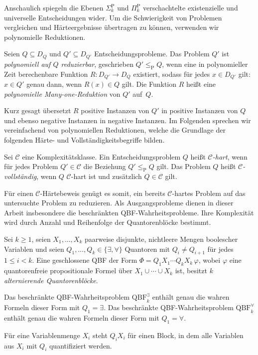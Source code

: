Anschaulich spiegeln die Ebenen
\(\Sigma_k^{\mathrm{P}}\) und \(\Pi_k^{\mathrm{P}}\)
verschachtelte existenzielle und universelle Entscheidungen wider.
Um die Schwierigkeit von Problemen vergleichen und Härteergebnisse
übertragen zu können, verwenden wir polynomielle Reduktionen.
\begin{Definition}
    \label{def:polynomial-reduction}
    Seien \(Q\subseteq D_Q\) und \(Q'\subseteq D_{Q'}\)
    Entscheidungsprobleme. Das Problem \(Q'\) ist
    \emph{polynomiell auf \(Q\) reduzierbar}, geschrieben
    \(Q'\leq_{\mathrm{P}}Q\), wenn eine in polynomieller Zeit
    berechenbare Funktion \(R\colon D_{Q'}\to D_Q\) existiert, sodass
    für jedes \(x\in D_{Q'}\) gilt:
    \(x\in Q'\) genau dann, wenn \(R(x)\in Q\) gilt. Die Funktion \(R\)
    heißt eine \emph{polynomielle Many-one-Reduktion} von \(Q'\) auf~\(Q\).
\end{Definition}
Kurz gesagt übersetzt \(R\) positive Instanzen von \(Q'\) in positive
Instanzen von \(Q\) und ebenso negative Instanzen in negative Instanzen.
Im Folgenden sprechen wir vereinfachend von polynomiellen Reduktionen,
welche die Grundlage der folgenden Härte- und Vollständigkeitsbegriffe bilden. 

\begin{Definition}
    \label{def:hardness-completeness}
    Sei \(\mathcal{C}\) eine Komplexitätsklasse. Ein
    Entscheidungsproblem \(Q\) heißt \emph{\(\mathcal{C}\)-hart}, wenn
    für jedes Problem \(Q'\in\mathcal{C}\) die Beziehung
    \(Q'\leq_{\mathrm{P}}Q\) gilt. Das Problem \(Q\) heißt
    \emph{\(\mathcal{C}\)-vollständig}, wenn \(Q\)
    \(\mathcal{C}\)-hart ist und zusätzlich \(Q\in\mathcal{C}\) gilt.
\end{Definition}
Für einen \(\mathcal{C}\)-Härtebeweis genügt es somit, ein bereits
\(\mathcal{C}\)-hartes Problem auf das untersuchte Problem zu reduzieren.
Als Ausgangsprobleme dienen in dieser Arbeit insbesondere die beschränkten
QBF-Wahrheitsprobleme. Ihre Komplexität wird
durch Anzahl und Reihenfolge der Quantorenblöcke bestimmt.
\begin{Definition}
    \label{def:bounded-qbf-truth}
    Sei \(k\geq 1\), seien \(X_1,\dots,X_k\) paarweise disjunkte,
    nichtleere Mengen boolescher Variablen und seien
    \(Q_1,\dots,Q_k\in\{\exists,\forall\}\) Quantoren mit
    \(Q_i\neq Q_{i+1}\) für jedes \(1\leq i<k\). Eine geschlossene QBF
    der Form
    \(\Phi=Q_1X_1\cdots Q_kX_k\,\varphi\), wobei \(\varphi\) eine
    quantorenfreie propositionale Formel über
    \(X_1\cup\cdots\cup X_k\) ist, besitzt \(k\)
    \emph{alternierende Quantorenblöcke}.

    Das beschränkte QBF-Wahrheitsproblem
    \(\mathrm{QBF}^{\exists}_k\) enthält genau die wahren Formeln dieser
    Form mit \(Q_1=\exists\). Das beschränkte QBF-Wahrheitsproblem
    \(\mathrm{QBF}^{\forall}_k\) enthält genau die wahren Formeln dieser
    Form mit \(Q_1=\forall\).
\end{Definition}
Für eine Variablenmenge \(X_i\) steht \(Q_iX_i\) für einen Block, in dem
alle Variablen aus \(X_i\) mit \(Q_i\) quantifiziert werden.

